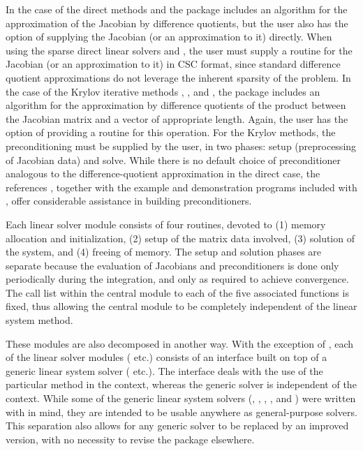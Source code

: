 In the case of the direct methods {\cvdense} and {\cvband} the package
includes an algorithm for the approximation of the Jacobian by
difference quotients, but the user also has the option of supplying
the Jacobian (or an approximation to it) directly.
When using the sparse direct linear solvers {\cvklu} and
{\cvsuperlumt}, the user must supply a routine for the Jacobian (or an
approximation to it) in CSC format, since standard difference quotient
approximations do not leverage the inherent sparsity of the problem.
In the case of the Krylov iterative methods {\cvspgmr}, {\cvspbcg},
and {\cvsptfqmr}, the package includes an algorithm for the
approximation by difference quotients of the product between the
Jacobian matrix and a vector of appropriate length. Again, the user
has the option of providing a routine for this operation.
For the Krylov methods, 
the preconditioning must be supplied by the user, in two phases: 
setup (preprocessing of Jacobian data) and solve.
While there is no default choice of
preconditioner analogous to the difference-quotient approximation
in the direct case, the references \cite{BrHi:89,Byr:92}, together
with the example and demonstration programs included with {\cvode}, offer
considerable assistance in building preconditioners.

Each {\cvode} linear solver module consists of four routines, devoted to (1)
memory allocation and initialization, (2) setup of the matrix data
involved, (3) solution of the system, and (4) freeing of memory.  
The setup and solution phases are separate because the evaluation of
Jacobians and preconditioners is done only periodically during the
integration, and only as required to achieve convergence. The call list within
the central {\cvode} module to each of the five associated functions is
fixed, thus allowing the central module to be completely independent
of the linear system method.

These modules are also decomposed in another way.
With the exception of {\cvdiag}, each of the linear solver modules
({\cvdense} etc.) consists of an interface built on top of a generic linear
system solver ({\dense} etc.).  The interface deals with the use of the
particular method in the {\cvode} context, whereas the generic solver is
independent of the context.  While some of the generic linear system solvers
({\dense}, {\band}, {\spgmr}, {\spbcg}, and {\sptfqmr}) were written with
{\sundials} in mind, they are intended to be usable anywhere as general-purpose
solvers.  This separation also allows for any generic solver to be replaced by
an improved version, with no necessity to revise the {\cvode} package elsewhere.

